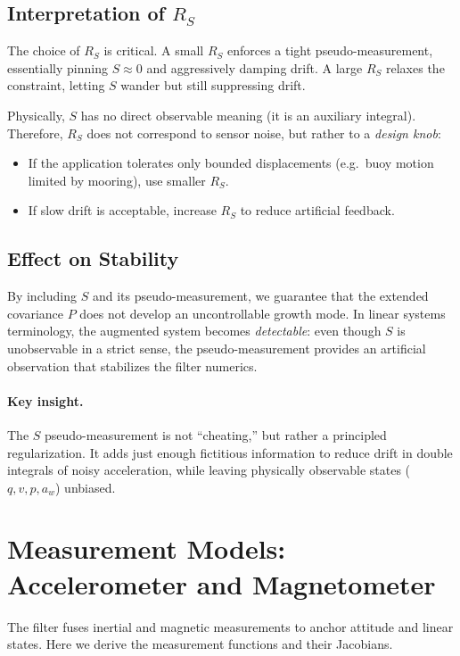 \documentclass[10pt]{extarticle}
\begin{document}
\subsection{Interpretation of $R_S$}
The choice of $R_S$ is critical. A small $R_S$ enforces a tight pseudo-measurement,
essentially pinning $S\approx 0$ and aggressively damping drift. A large $R_S$ relaxes
the constraint, letting $S$ wander but still suppressing drift.

Physically, $S$ has no direct observable meaning (it is an auxiliary integral).
Therefore, $R_S$ does not correspond to sensor noise, but rather to a 
\emph{design knob}:
\begin{itemize}
\item If the application tolerates only bounded displacements (e.g.\ buoy motion limited
by mooring), use smaller $R_S$.
\item If slow drift is acceptable, increase $R_S$ to reduce artificial feedback.
\end{itemize}

\subsection{Effect on Stability}
By including $S$ and its pseudo-measurement, we guarantee that the extended covariance $P$
does not develop an uncontrollable growth mode. In linear systems terminology, the augmented
system becomes \emph{detectable}: even though $S$ is unobservable in a strict sense, the 
pseudo-measurement provides an artificial observation that stabilizes the filter numerics.

\paragraph{Key insight.} 
The $S$ pseudo-measurement is not “cheating,” but rather a principled
regularization. It adds just enough fictitious information to reduce drift in double integrals of noisy acceleration, 
while leaving physically observable states ($q,v,p,a_w$) unbiased.

\section{Measurement Models: Accelerometer and Magnetometer}
\label{sec:meas-models}

The filter fuses inertial and magnetic measurements to anchor attitude and
linear states. Here we derive the measurement functions and their Jacobians.
\end{document}
